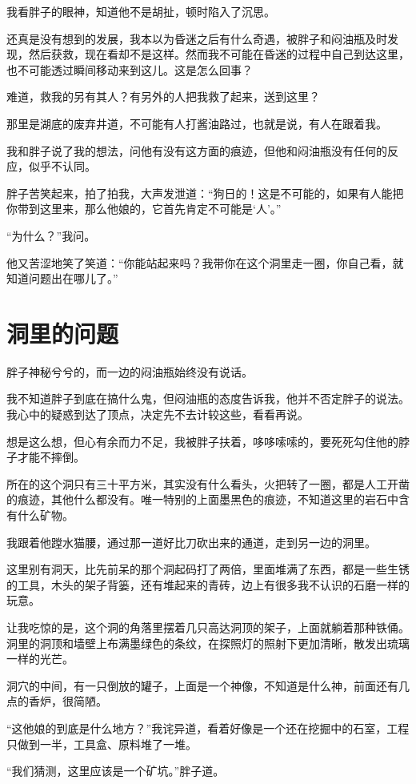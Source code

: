 我看胖子的眼神，知道他不是胡扯，顿时陷入了沉思。

还真是没有想到的发展，我本以为昏迷之后有什么奇遇，被胖子和闷油瓶及时发现，然后获救，现在看却不是这样。然而我不可能在昏迷的过程中自己到达这里，也不可能透过瞬间移动来到这儿。这是怎么回事？

难道，救我的另有其人？有另外的人把我救了起来，送到这里？

那里是湖底的废弃井道，不可能有人打酱油路过，也就是说，有人在跟着我。

我和胖子说了我的想法，问他有没有这方面的痕迹，但他和闷油瓶没有任何的反应，似乎不认同。

胖子苦笑起来，拍了拍我，大声发泄道：“狗日的！这是不可能的，如果有人能把你带到这里来，那么他娘的，它首先肯定不可能是‘人’。”

“为什么？”我问。

他又苦涩地笑了笑道：“你能站起来吗？我带你在这个洞里走一圈，你自己看，就知道问题出在哪儿了。”

\chapter{洞里的问题}

胖子神秘兮兮的，而一边的闷油瓶始终没有说话。

我不知道胖子到底在搞什么鬼，但闷油瓶的态度告诉我，他并不否定胖子的说法。我心中的疑惑到达了顶点，决定先不去计较这些，看看再说。

想是这么想，但心有余而力不足，我被胖子扶着，哆哆嗦嗦的，要死死勾住他的脖子才能不摔倒。

所在的这个洞只有三十平方米，其实没有什么看头，火把转了一圈，都是人工开凿的痕迹，其他什么都没有。唯一特别的上面墨黑色的痕迹，不知道这里的岩石中含有什么矿物。

我跟着他蹚水猫腰，通过那一道好比刀砍出来的通道，走到另一边的洞里。

这里别有洞天，比先前呆的那个洞起码打了两倍，里面堆满了东西，都是一些生锈的工具，木头的架子背篓，还有堆起来的青砖，边上有很多我不认识的石磨一样的玩意。

让我吃惊的是，这个洞的角落里摆着几只高达洞顶的架子，上面就躺着那种铁俑。洞里的洞顶和墙壁上布满墨绿色的条纹，在探照灯的照射下更加清晰，散发出琉璃一样的光芒。

洞穴的中间，有一只倒放的罐子，上面是一个神像，不知道是什么神，前面还有几点的香炉，很简陋。

“这他娘的到底是什么地方？”我诧异道，看着好像是一个还在挖掘中的石室，工程只做到一半，工具盒、原料堆了一堆。

“我们猜测，这里应该是一个矿坑。”胖子道。

